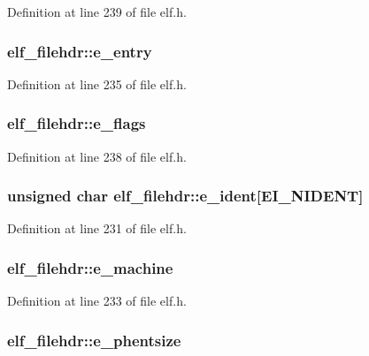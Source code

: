 Definition at line 239 of file elf.h.
\subsubsection[{e\_\-entry}]{ {\bf elf\_\-filehdr::e\_\-entry}}\label{structelf__filehdr_50496f1d30a2573cd5d15bab9dd16b2c}




Definition at line 235 of file elf.h.
\subsubsection[{e\_\-flags}]{ {\bf elf\_\-filehdr::e\_\-flags}}\label{structelf__filehdr_9509d41ab2f641625372e37b5cf2c6db}




Definition at line 238 of file elf.h.
\subsubsection[{e\_\-ident}]{\setlength{\rightskip}{0pt plus 5cm}unsigned char {\bf elf\_\-filehdr::e\_\-ident}[EI\_\-NIDENT]}\label{structelf__filehdr_9c9a6297dbdf20ef98f4ef9299efdc51}




Definition at line 231 of file elf.h.
\subsubsection[{e\_\-machine}]{ {\bf elf\_\-filehdr::e\_\-machine}}\label{structelf__filehdr_d9a8acc8fd4637ed09f4b34ddeb5bf7e}




Definition at line 233 of file elf.h.
\subsubsection[{e\_\-phentsize}]{ {\bf elf\_\-filehdr::e\_\-phentsize}}\label{structelf__filehdr_951a4bd82b0eb1d9d5454c2a1c42f5a3}




